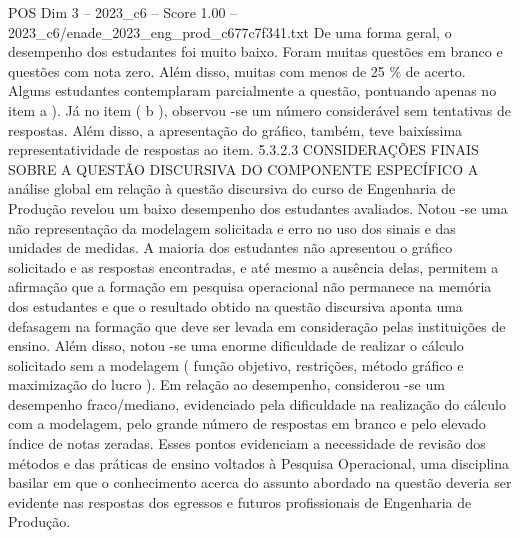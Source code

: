 \begin{textsample}{POS Dim 3 – 2023\_c6 – Score 1.00 – 2023\_c6/enade\_2023\_eng\_prod\_c677c7f341.txt}
De uma forma geral, o desempenho dos estudantes foi muito baixo.
Foram muitas questões em branco e questões com nota zero.
Além disso, muitas com menos de 25 \% de acerto.
Alguns estudantes contemplaram parcialmente a questão, pontuando apenas no item a ).
Já no item ( b ), observou -se um número considerável sem tentativas de respostas.
Além disso, a apresentação do gráfico, também, teve baixíssima representatividade de respostas ao item. 5.3.2.3 CONSIDERAÇÕES FINAIS SOBRE A QUESTÃO DISCURSIVA DO COMPONENTE ESPECÍFICO A análise global em relação à questão discursiva do curso de Engenharia de Produção revelou um baixo desempenho dos estudantes avaliados.
Notou -se uma não representação da modelagem solicitada e erro no uso dos sinais e das unidades de medidas.
A maioria dos estudantes não apresentou o gráfico solicitado e as respostas encontradas, e até mesmo a ausência delas, permitem a afirmação que a formação em pesquisa operacional não permanece na memória dos estudantes e que o resultado obtido na questão discursiva aponta uma defasagem na formação que deve ser levada em consideração pelas instituições de ensino.
Além disso, notou -se uma enorme dificuldade de realizar o cálculo solicitado sem a modelagem ( função objetivo, restrições, método gráfico e maximização do lucro ).
Em relação ao desempenho, considerou -se um desempenho fraco/mediano, evidenciado pela dificuldade na realização do cálculo com a modelagem, pelo grande número de respostas em branco e pelo elevado índice de notas zeradas.
Esses pontos evidenciam a necessidade de revisão dos métodos e das práticas de ensino voltados à Pesquisa Operacional, uma disciplina basilar em que o conhecimento acerca do assunto abordado na questão deveria ser evidente nas respostas dos egressos e futuros profissionais de Engenharia de Produção.

\end{textsample}
